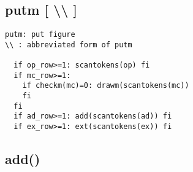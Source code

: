 \documentclass[a4paper]{article}
\begin{document}
\subsection{putm [ \textbackslash\textbackslash{ }]}
%
\index{\textbackslash\textbackslash}%
\begin{verbatim}
putm: put figure
\\ : abbreviated form of putm

  if op_row>=1: scantokens(op) fi
  if mc_row>=1:
    if checkm(mc)=0: drawm(scantokens(mc))
    fi
  fi
  if ad_row>=1: add(scantokens(ad)) fi
  if ex_row>=1: ext(scantokens(ex)) fi
\end{verbatim}
\newpage
\subsection{add()}
%
\index{++()}%
%
%
%
%
%
%
%
%
%
%
%
%
%
\index{/*}%
\index{**}%
\index{\textgreater\textgreater}%
%
%
%
%
%
%
%
%
%
%
%
%
%
%
%
%
%
%
%
\end{document}

